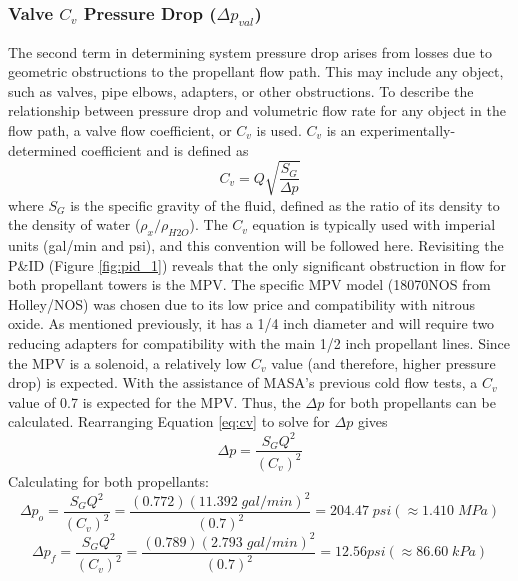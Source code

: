 \documentclass[9pt]{article} %
\numberwithin{equation}{section} %
\begin{document}
\subsubsection{Valve $C_{v}$ Pressure Drop ($\Delta p_{val}$)}

\hspace{\parindent} The second term in determining system pressure drop arises from losses due to geometric obstructions to the propellant flow path. This may include any object, such as valves, pipe elbows, adapters, or other obstructions. To describe the relationship between pressure drop and volumetric flow rate for any object in the flow path, a valve flow coefficient, or $C_{v}$ is used. $C_{v}$ is an experimentally-determined coefficient and is defined as
\begin{equation} \label{eq:cv}
C_{v} = Q \sqrt{\frac{S_{G}}{\Delta p}}
\end{equation}
where $S_{G}$ is the specific gravity of the fluid, defined as the ratio of its density to the density of water ($\rho_{x}/\rho_{H2O}$). The $C_{v}$ equation is typically used with imperial units (gal/min and psi), and this convention will be followed here. Revisiting the P\&ID (Figure \ref{fig:pid_1}) reveals that the only significant obstruction in flow for both propellant towers is the MPV. The specific MPV model (18070NOS from Holley/NOS) was chosen due to its low price and compatibility with nitrous oxide. As mentioned previously, it has a 1/4 inch diameter and will require two reducing adapters for compatibility with the main 1/2 inch propellant lines. Since the MPV is a solenoid, a relatively low $C_{v}$ value (and therefore, higher pressure drop) is expected. With the assistance of MASA's previous cold flow tests, a $C_{v}$ value of 0.7 is expected for the MPV. Thus, the $\Delta p$ for both propellants can be calculated. Rearranging Equation \ref{eq:cv} to solve for $\Delta p$ gives
\begin{equation}
\Delta p = \frac{S_{G} Q^{2}}{(C_{v})^{2}}
\end{equation}
Calculating for both propellants:
\begin{equation*}
\Delta p_{o} = \frac{S_{G} Q^{2}}{(C_{v})^{2}} = \frac{(0.772)(11.392 \; gal/min)^{2}}{(0.7)^{2}} = 204.47 \; psi (\approx 1.410 \; MPa)
\end{equation*}
\begin{equation*}
\Delta p_{f} = \frac{S_{G} Q^{2}}{(C_{v})^{2}} = \frac{(0.789)(2.793 \; gal/min)^{2}}{(0.7)^{2}} = 12.56 psi (\approx 86.60 \; kPa)
\end{equation*}
\end{document}
